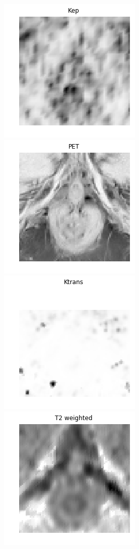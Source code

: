 \documentclass[12pt,DIV14,BCOR12mm,a4paper,footinclude=false,headinclude,parskip=half-,twoside,openright,cleardoublepage=empty,toc=index,bibliography=totoc,listof=totoc]{scrreprt}
\numberwithin{equation}{chapter}
\begin{document}
\begin{figure}
	\centering
	\includegraphics[scale=0.32]{image/Kep}
	\includegraphics[scale=0.32]{image/Pet}
	\includegraphics[scale=0.32]{image/ktrans}
	\includegraphics[scale=0.32]{image/T2_weighted}

\end{figure}
\end{document}
